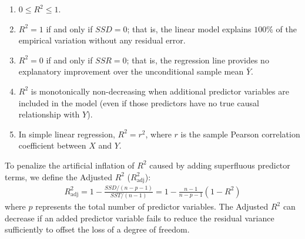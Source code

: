 \begin{observacion}[Properties of $R^2$]
	\begin{enumerate}
		\item $0 \leq R^2 \leq 1$.
		\item $R^2 = 1$ if and only if $SSD = 0$; that is, the linear model explains $100\%$ of the empirical variation without any residual error.
		\item $R^2 = 0$ if and only if $SSR = 0$; that is, the regression line provides no explanatory improvement over the unconditional sample mean $\bar{Y}$.
		\item $R^2$ is monotonically non-decreasing when additional predictor variables are included in the model (even if those predictors have no true causal relationship with $Y$).
		\item In simple linear regression, $R^2 = r^2$, where $r$ is the sample Pearson correlation coefficient between $X$ and $Y$.
	\end{enumerate}
\end{observacion}

\begin{observacion}[Adjusted $R^2$]
	To penalize the artificial inflation of $R^2$ caused by adding superfluous predictor terms, we define the Adjusted $R^2$ ($R^2_{\text{adj}}$):
	\begin{align}
		R^2_{\text{adj}} = 1 - \frac{SSD / (n - p - 1)}{SST / (n - 1)} = 1 - \frac{n - 1}{n - p - 1}(1 - R^2)
	\end{align}
	where $p$ represents the total number of predictor variables. The Adjusted $R^2$ can decrease if an added predictor variable fails to reduce the residual variance sufficiently to offset the loss of a degree of freedom.
\end{observacion}

% 
%

